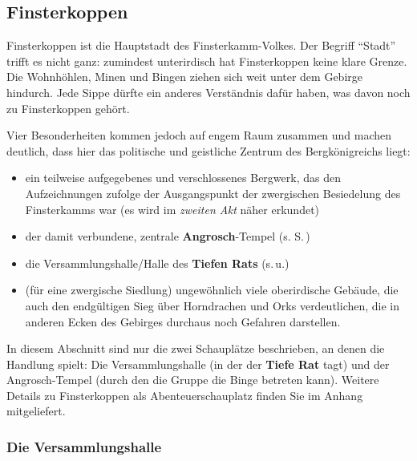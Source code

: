 \subsection{Finsterkoppen}
Finsterkoppen ist die Hauptstadt des Finsterkamm-Volkes.
Der Begriff \enquote{Stadt} trifft es nicht ganz: zumindest unterirdisch hat Finsterkoppen keine klare Grenze.
Die Wohnhöhlen, Minen und Bingen ziehen sich weit unter dem Gebirge hindurch.
Jede Sippe dürfte ein anderes Verständnis dafür haben, was davon noch zu Finsterkoppen gehört.

Vier Besonderheiten kommen jedoch auf engem Raum zusammen und machen deutlich, dass hier das politische und geistliche Zentrum des Bergkönigreichs liegt:
\begin{itemize}
	\item ein teilweise aufgegebenes und verschlossenes Bergwerk, das den Aufzeichnungen zufolge der Ausgangspunkt der zwergischen Besiedelung des Finsterkamms war (es wird im \emph{zweiten Akt} näher erkundet)
	\item der damit verbundene, zentrale \textbf{Angrosch}-Tempel (s. S.\,\pageref{angrosch})
	\item die Versammlungshalle/Halle des \textbf{Tiefen Rats} (s.\,u.)
	\item (für eine zwergische Siedlung)  ungewöhnlich viele oberirdische Gebäude, die auch den endgültigen Sieg über Horndrachen und Orks verdeutlichen,
	die in anderen Ecken des Gebirges durchaus noch Gefahren darstellen.
\end{itemize}

In diesem Abschnitt sind nur die zwei Schauplätze beschrieben, an denen die Handlung spielt: Die Versammlungshalle (in der der \textbf{Tiefe Rat} tagt) und der Angrosch-Tempel (durch den die Gruppe die Binge betreten kann). Weitere Details zu Finsterkoppen als Abenteuerschauplatz finden Sie im Anhang mitgeliefert.


\vfill

\subsubsection{Die Versammlungshalle}



